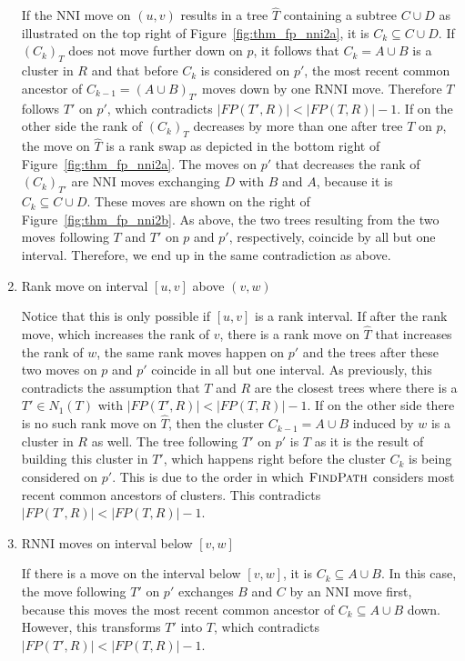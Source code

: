 \documentclass{amsart}
\newcommand{\rnni}{\mathrm{RNNI}}
\newcommand{\findpath}{\textsc{FindPath}}
\newcommand{\nni}{\mathrm{NNI}}
\begin{document}
\begin{enumerate}
    If the $\nni$ move on $(u,v)$ results in a tree $\hat T$ containing a subtree $C \cup D$ as illustrated on the top right of Figure~\ref{fig:thm_fp_nni2a}, it is $C_k \subseteq C \cup D$.
    If $(C_k)_T$ does not move further down on $p$, it follows that $C_k = A \cup B$ is a cluster in $R$ and that before $C_k$ is considered on $p'$, the most recent common ancestor of $C_{k-1} = (A \cup B)_{T'}$ moves down by one $\rnni$ move.
    Therefore $T$ follows $T'$ on $p'$, which contradicts $|FP(T',R)| < |FP(T,R)| - 1$.
    If on the other side the rank of $(C_k)_T$ decreases by more than one after tree $T$ on $p$, the move on $\hat T$ is a rank swap as depicted in the bottom right of Figure~\ref{fig:thm_fp_nni2a}.
    The moves on $p'$ that decreases the rank of $(C_k)_{T'}$ are $\nni$ moves exchanging $D$ with $B$ and $A$, because it is $C_k \subseteq C \cup D$.
    These moves are shown on the right of Figure~\ref{fig:thm_fp_nni2b}.
    As above, the two trees resulting from the two moves following $T$ and $T'$ on $p$ and $p'$, respectively, coincide by all but one interval.
    Therefore, we end up in the same contradiction as above.

    \item Rank move on interval $[u,v]$ above $(v,w)$

    Notice that this is only possible if $[u,v]$ is a rank interval.
    If after the rank move, which increases the rank of $v$, there is a rank move on $\hat T$ that increases the rank of $w$, the same rank moves happen on $p'$ and the trees after these two moves on $p$ and $p'$ coincide in all but one interval.
    As previously, this contradicts the assumption that $T$ and $R$ are the closest trees where there is a $T' \in N_1(T)$ with $|FP(T',R)| < |FP(T,R)| - 1$.
    If on the other side there is no such rank move on $\hat T$, then the cluster $C_{k-1} = A \cup B$ induced by $w$ is a cluster in $R$ as well.
    The tree following $T'$ on $p'$ is $T$ as it is the result of building this cluster in $T'$, which happens right before the cluster $C_k$ is being considered on $p'$.
    This is due to the order in which $\findpath$ considers most recent common ancestors of clusters.
    This contradicts $|FP(T',R)| < |FP(T,R)| - 1$.

    \item $\rnni$ moves on interval below $[v,w]$

    If there is a move on the interval below $[v,w]$, it is $C_k \subseteq A \cup B$.
    In this case, the move following $T'$ on $p'$ exchanges $B$ and $C$ by an $\nni$ move first, because this moves the most recent common ancestor of $C_k \subseteq A \cup B$ down.
    However, this transforms $T'$ into $T$, which contradicts $|FP(T',R)| < |FP(T,R)| - 1$.
\end{enumerate}
\end{document}
